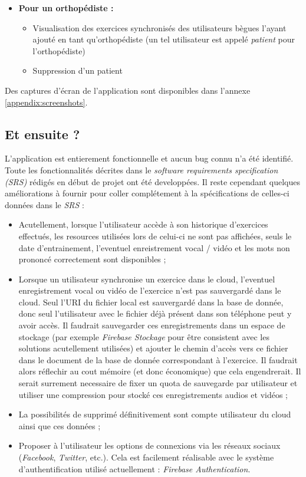 \begin{itemize}
  \item \textbf{Pour un orthopédiste :}
  \begin{itemize}
    \item Visualisation des exercices synchronisés des utilisateurs bègues l'ayant ajouté en tant qu'orthopédiste (un tel utilisateur est appelé \textit{patient} pour l'orthopédiste)
    \item Suppression d'un patient
  \end{itemize}
\end{itemize}

Des captures d'écran de l'application sont disponibles dans l'annexe \ref{appendix:screenshots}.

\subsection{Et ensuite ?}
L'application est entierement fonctionnelle et aucun bug connu n'a été identifié.  Toute les fonctionnalités décrites dans le \textit{software requirements specification (SRS)} rédigés en début de projet ont été developpées. Il reste cependant quelques améliorations à fournir pour coller complétement à la spécifications de celles-ci données dans le \textit{SRS} :

\begin{itemize}
  \item Acutellement, lorsque l'utilisateur accède à son historique d'exercices effectués, les resources utilisées lors de celui-ci ne sont pas affichées, seuls le date d'entrainement, l'eventuel enreistrement vocal / vidéo et les mots non prononcé correctement sont disponibles ;
  \item Lorsque un utilisateur synchronise un exercice dans le cloud, l'eventuel enregistrement vocal ou vidéo de l'exercice n'est pas sauvergardé dans le cloud. Seul l'URI du fichier local est sauvergardé dans la base de donnée, donc seul l'utilisateur avec le fichier déjà présent dans son téléphone peut y avoir accès. Il faudrait sauvegarder ces enregistrements dans un espace de stockage (par exemple \textit{Firebase Stockage} pour être consistent avec les solutions acutellement utilisées) et ajouter le chemin d'accès vers ce fichier dans le document de la base de donnée correspondant à l'exercice. Il faudrait alors réflechir au cout mémoire (et donc économique) que cela engendrerait. Il serait surrement necessaire de fixer un quota de sauvegarde par utilisateur et utiliser une compression pour stocké ces enregistrements audios et vidéos ;
  \item La possibilités de supprimé définitivement sont compte utilisateur du cloud ainsi que ces données ;
  \item Proposer à l'utilisateur les options de connexions via les réseaux sociaux (\textit{Facebook}, \textit{Twitter}, etc.). Cela est facilement réalisable avec le système d'authentification utilisé actuellement : \textit{Firebase Authentication}.
\end{itemize}

